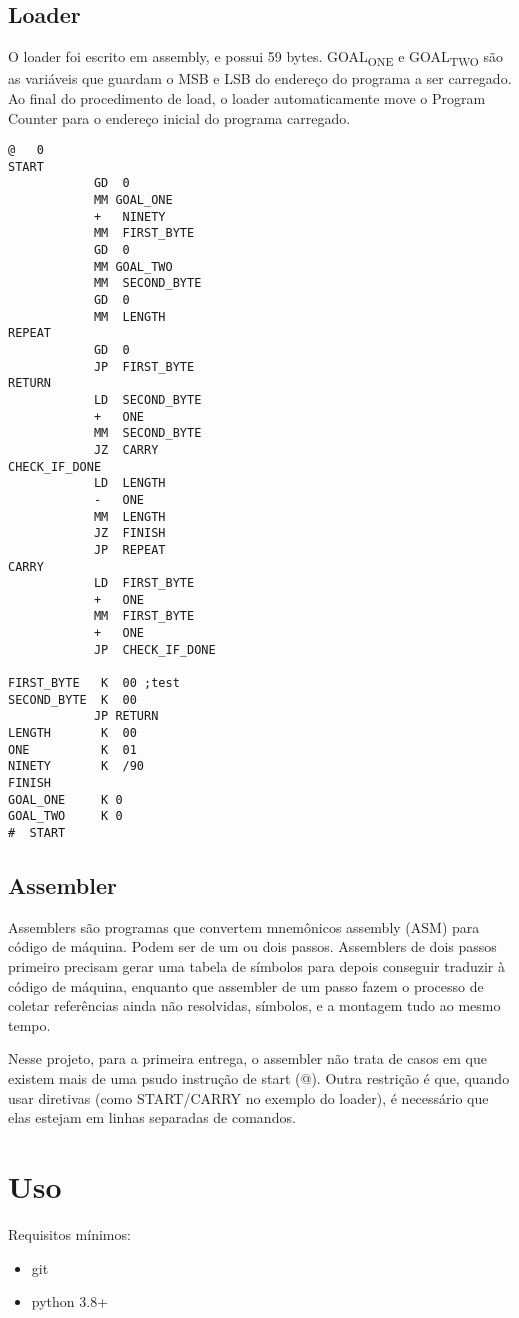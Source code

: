 \documentclass[11pt]{article}
\begin{document}
\subsection{Loader}
\label{sec:org55e498e}
O loader foi escrito em assembly, e possui 59 bytes. GOAL\textsubscript{ONE} e GOAL\textsubscript{TWO} são as variáveis que guardam o MSB e LSB do endereço do programa a ser carregado. Ao final do procedimento de load, o loader automaticamente move o Program Counter para o endereço inicial do programa carregado.
\begin{verbatim}
@   0
START
            GD  0
            MM GOAL_ONE
            +   NINETY
            MM  FIRST_BYTE
            GD  0
            MM GOAL_TWO
            MM  SECOND_BYTE
            GD  0
            MM  LENGTH
REPEAT
            GD  0
            JP  FIRST_BYTE
RETURN
            LD  SECOND_BYTE
            +   ONE
            MM  SECOND_BYTE
            JZ  CARRY
CHECK_IF_DONE
            LD  LENGTH
            -   ONE
            MM  LENGTH
            JZ  FINISH
            JP  REPEAT
CARRY
            LD  FIRST_BYTE
            +   ONE
            MM  FIRST_BYTE
            +   ONE
            JP  CHECK_IF_DONE

FIRST_BYTE   K  00 ;test
SECOND_BYTE  K  00
            JP RETURN
LENGTH       K  00
ONE          K  01
NINETY       K  /90
FINISH
GOAL_ONE     K 0
GOAL_TWO     K 0
#  START
\end{verbatim}
\subsection{Assembler}
\label{sec:orge872498}
Assemblers são programas que convertem mnemônicos assembly (ASM) para código de
máquina. Podem ser de um ou dois passos. Assemblers de dois passos primeiro
precisam gerar uma tabela de símbolos para depois conseguir traduzir à código de
máquina, enquanto que assembler de um passo fazem o processo de coletar
referências ainda não resolvidas, símbolos, e a montagem tudo ao mesmo tempo.

Nesse projeto, para a primeira entrega, o assembler não trata de casos em que existem mais de uma psudo instrução de start (@). Outra restrição é que, quando usar diretivas (como START/CARRY no exemplo do loader), é necessário que elas estejam em linhas separadas de comandos.

\section{Uso}
\label{sec:org482da1e}
Requisitos mínimos:
\begin{itemize}
\item git
\item python 3.8+
\end{itemize}
\end{document}
